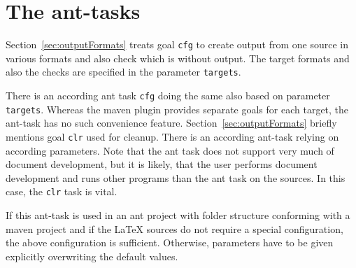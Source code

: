 \section{The ant-tasks}\label{sec:usageAntTask}


Section~\ref{sec:outputFormats} treats goal \texttt{cfg} 
to create output from one source in various formats 
and also check which is without output. 
The target formats and also the checks are specified in the parameter \texttt{targets}. 

There is an according ant task \texttt{cfg} 
doing the same also based on parameter \texttt{targets}. 
Whereas the maven plugin provides separate goals for each target, 
the ant-task has no such convenience feature. 
Section~\ref{sec:outputFormats} briefly mentions goal \texttt{clr} 
used for cleanup. 
There is an according ant-task relying on according parameters. 
Note that the ant task does not support very much of document development, 
but it is likely, that the user performs document development 
and runs other programs than the ant task on the sources. 
In this case, the \texttt{clr} task is vital. 


If this ant-task is used in an ant project 
with folder structure conforming with a maven project 
and if the \LaTeX{} sources do not require a special configuration, 
the above configuration is sufficient. 
Otherwise, parameters have to be given explicitly 
overwriting the default values. 

